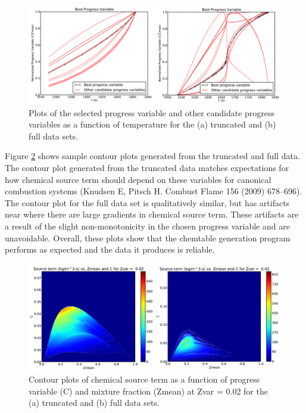 \documentclass[11pt]{article}
\begin{document}
\begin{figure} [h]
\centering
\includegraphics[width=\textwidth]{xa_xb}
\caption{\label{fig:xa_xb} Plots of the selected progress variable and other candidate progress variables as a function of temperature for the (a) truncated and (b) full data sets.
}
\end{figure}

Figure \ref{fig:ya_yb} shows sample contour plots generated from the truncated and full data. The contour plot generated from the truncated data matches expectations for how chemical source term should depend on these variables for canonical combustion systems (Knudsen E, Pitsch H. Combust Flame  156 (2009) 678–696). The contour plot for the full data set is qualitatively similar, but has artifacts near where there are large gradients in chemical source term. These artifacts are a result of the slight non-monotonicity in the chosen progress variable and are unavoidable. Overall, these plots show that the chemtable generation program performs as expected and the data it produces is reliable. 

\begin{figure} [h]
\centering
\includegraphics[width=\textwidth]{ya_yb}
\caption{\label{fig:ya_yb} Contour plots of chemical source term as a function of progress variable (C) and mixture fraction (Zmean) at Zvar = 0.02 for the (a) truncated and (b) full data sets.}
\end{figure}
\end{document}
